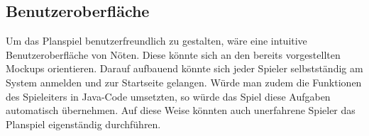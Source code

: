 \subsection{Benutzeroberfläche}
\label{sec:fazit-spielverlauf-benutzeroberflaeche}

Um das Planspiel benutzerfreundlich zu gestalten, wäre eine intuitive Benutzeroberfläche von Nöten. Diese könnte sich an den bereits vorgestellten Mockups orientieren. Darauf aufbauend könnte sich jeder Spieler selbstständig am System anmelden und zur Startseite gelangen. Würde man zudem die Funktionen des Spieleiters in Java-Code umsetzten, so würde das Spiel diese Aufgaben automatisch übernehmen. Auf diese Weise könnten auch unerfahrene Spieler das Planspiel eigenständig durchführen. 
